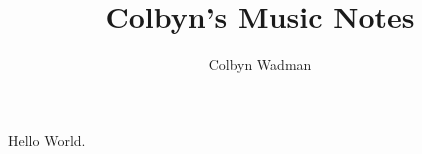 \documentclass{article}
\title{Colbyn's Music Notes}
\author{Colbyn Wadman}
\begin{document}
\maketitle

 



Hello World.

% 

\end{document}
